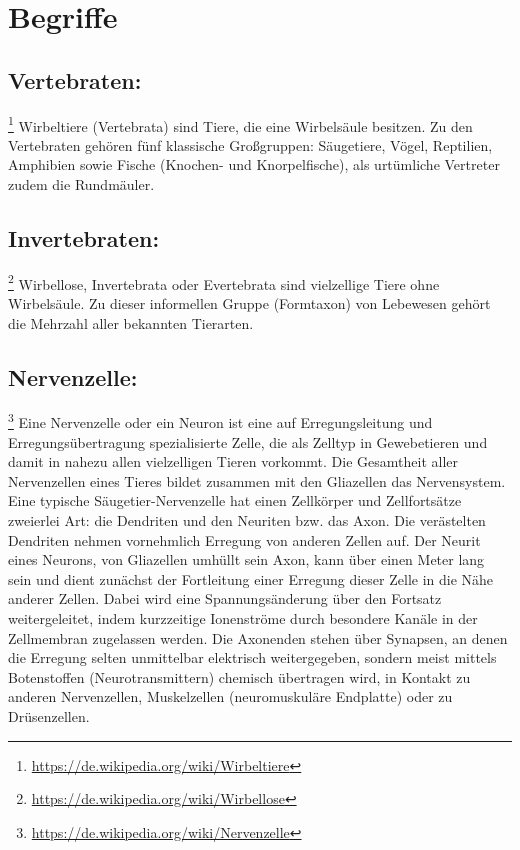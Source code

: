 \section*{Begriffe}

\subsection{Vertebraten:}\footnote{\url{https://de.wikipedia.org/wiki/Wirbeltiere}} Wirbeltiere (Vertebrata) sind Tiere, die eine Wirbelsäule besitzen. Zu den Vertebraten gehören fünf klassische Großgruppen: Säugetiere, Vögel, Reptilien, Amphibien sowie Fische (Knochen- und Knorpelfische), als urtümliche Vertreter zudem die Rundmäuler.

\subsection{Invertebraten:}\footnote{\url{https://de.wikipedia.org/wiki/Wirbellose}} Wirbellose, Invertebrata oder Evertebrata sind vielzellige Tiere ohne Wirbelsäule. Zu dieser informellen Gruppe (Formtaxon) von Lebewesen gehört die Mehrzahl aller bekannten Tierarten.

\subsection{Nervenzelle:}\footnote{\url{https://de.wikipedia.org/wiki/Nervenzelle}} Eine Nervenzelle oder ein Neuron ist eine auf Erregungsleitung und Erregungsübertragung spezialisierte Zelle, die als Zelltyp in Gewebetieren und damit in nahezu allen vielzelligen Tieren vorkommt. Die Gesamtheit aller Nervenzellen eines Tieres bildet zusammen mit den Gliazellen das Nervensystem.\\
Eine typische Säugetier-Nervenzelle hat einen Zellkörper und Zellfortsätze zweierlei Art: die Dendriten und den Neuriten bzw. das Axon. Die verästelten Dendriten nehmen vornehmlich Erregung von anderen Zellen auf. Der Neurit eines Neurons, von Gliazellen umhüllt sein Axon, kann über einen Meter lang sein und dient zunächst der Fortleitung einer Erregung dieser Zelle in die Nähe anderer Zellen. Dabei wird eine Spannungsänderung über den Fortsatz weitergeleitet, indem kurzzeitige Ionenströme durch besondere Kanäle in der Zellmembran zugelassen werden.
Die Axonenden stehen über Synapsen, an denen die Erregung selten unmittelbar elektrisch weitergegeben, sondern meist mittels Botenstoffen (Neurotransmittern) chemisch übertragen wird, in Kontakt zu anderen Nervenzellen, Muskelzellen (neuromuskuläre Endplatte) oder zu Drüsenzellen.

